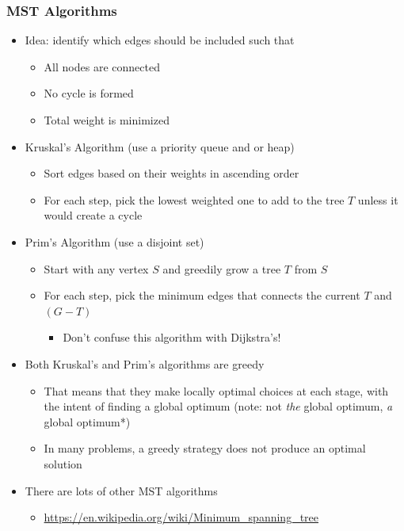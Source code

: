 \documentclass[
  10pt,
  english,
  letterpaper,
,tablecaptionabove
]{scrartcl}
\providecommand{\tightlist}{%
  \setlength{\itemsep}{0pt}\setlength{\parskip}{0pt}}
\begin{document}
\hypertarget{mst-algorithms}{%
\subsubsection{MST Algorithms}\label{mst-algorithms}}

\begin{itemize}
\tightlist
\item
  Idea: identify which edges should be included such that

  \begin{itemize}
  \tightlist
  \item
    All nodes are connected
  \item
    No cycle is formed
  \item
    Total weight is minimized
  \end{itemize}
\item
  Kruskal's Algorithm (use a priority queue and or heap)

  \begin{itemize}
  \tightlist
  \item
    Sort edges based on their weights in ascending order
  \item
    For each step, pick the lowest weighted one to add to the tree \(T\)
    unless it would create a cycle
  \end{itemize}
\item
  Prim's Algorithm (use a disjoint set)

  \begin{itemize}
  \tightlist
  \item
    Start with any vertex \(S\) and greedily grow a tree \(T\) from
    \(S\)
  \item
    For each step, pick the minimum edges that connects the current
    \(T\) and \((G-T)\)

    \begin{itemize}
    \tightlist
    \item
      Don't confuse this algorithm with Dijkstra's!
    \end{itemize}
  \end{itemize}
\item
  Both Kruskal's and Prim's algorithms are greedy

  \begin{itemize}
  \tightlist
  \item
    That means that they make locally optimal choices at each stage,
    with the intent of finding a global optimum (note: not \emph{the}
    global optimum, \emph{a} global optimum*)
  \item
    In many problems, a greedy strategy does not produce an optimal
    solution
  \end{itemize}
\item
  There are lots of other MST algorithms

  \begin{itemize}
  \tightlist
  \item
    \url{https://en.wikipedia.org/wiki/Minimum_spanning_tree}
  \end{itemize}
\end{itemize}
\end{document}
